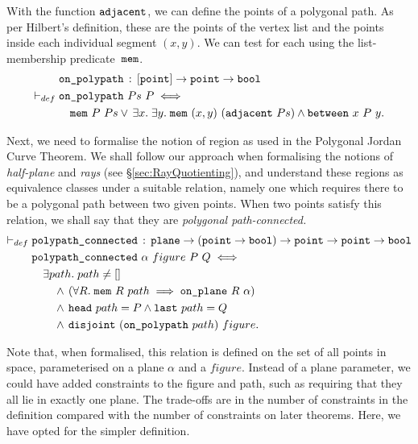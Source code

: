 With the function $\texttt{adjacent}$, we can define the points of a polygonal path. As per Hilbert's definition, these are the points of the vertex list and the points inside each individual segment $(x,y)$. We can test for each using the list-membership predicate~$\texttt{mem}$.
\begin{equation}\label{eq:OnPolyPath}
  \begin{split}
    &\texttt{on\_polypath}\,:\,[\texttt{point}] \rightarrow \texttt{point} \rightarrow \texttt{bool}\\
    \vdash_{def}\;&\texttt{on\_polypath}\ Ps\ P \iff \\
    &\quad\texttt{mem}\ P\ Ps\vee\,\exists x.\;\exists y.\; \texttt{mem}\ (x,y)\ (\texttt{adjacent}\ Ps) \wedge \texttt{between}\ x\ P\ y.
  \end{split}
\end{equation}

Next, we need to formalise the notion of region as used in the Polygonal Jordan Curve Theorem. We shall follow our approach when formalising the notions of \emph{half-plane} and \emph{rays} (see \S\ref{sec:RayQuotienting}), and understand these regions as equivalence classes under a suitable relation, namely one which requires there to be a polygonal path between two given points. When two points satisfy this relation, we shall say that they are \emph{polygonal path-connected.}
\begin{align*}
  \vdash_{def}\;&\code{polypath\_connected}\,:\,\code{plane}\rightarrow(\code{point} \rightarrow \code{bool}) \rightarrow \code{point} \rightarrow \code{point} \rightarrow \code{bool}\\
  &\code{polypath\_connected}\ \alpha\ figure\ P\ Q \iff\\
  &\quad\exists path.\; path \neq []\\
  &\qquad\wedge\,(\forall R.\;\code{mem}\ R\ path \implies \onplane{R}{\alpha})\\
  &\qquad\wedge\,\code{head}\ path = P \wedge \code{last}\ path = Q\\
  &\qquad\wedge\,\code{disjoint}\ (\code{on\_polypath}\ path)\ figure.
\end{align*}

Note that, when formalised, this relation is defined on the set of all points in space, parameterised on a plane $\alpha$ and a $figure$. Instead of a plane parameter, we could have added constraints to the figure and path, such as requiring that they all lie in exactly one plane. The trade-offs are in the number of constraints in the definition compared with the number of constraints on later theorems. Here, we have opted for the simpler definition.

